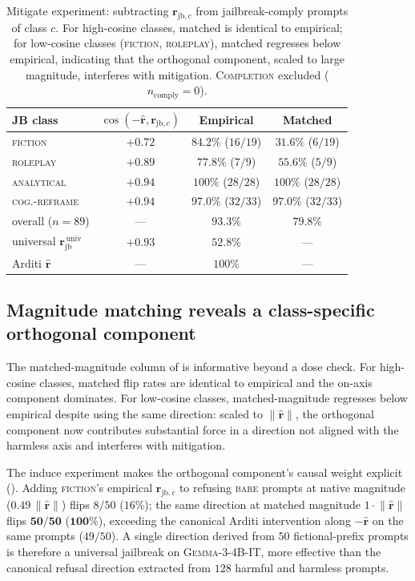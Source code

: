 \documentclass{article}
\newcommand{\rhat}{\hat{\bm{r}}}
\newcommand{\rjb}{\bm{r}_{\mathrm{jb}}}
\newcommand{\rjbc}{\bm{r}_{\mathrm{jb},c}}
\newcommand{\norm}[1]{\lVert #1 \rVert}
\newcommand{\gemma}{\textsc{Gemma-3-4B-IT}}
\begin{document}
\begin{table}[!t]
\centering
\small
\setlength{\tabcolsep}{3pt}
\begin{tabular}{lccc}
\toprule
JB class & $\cos(-\rhat, \rjbc)$ & Empirical & Matched \\
\midrule
\textsc{fiction}            & $+0.72$ & $84.2\%$ ($16/19$) & $31.6\%$ ($6/19$) \\
\textsc{roleplay}           & $+0.89$ & $77.8\%$ ($7/9$)   & $55.6\%$ ($5/9$) \\
\textsc{analytical}         & $+0.94$ & $100\%$ ($28/28$)  & $100\%$ ($28/28$) \\
\textsc{cog.-reframe}       & $+0.94$ & $97.0\%$ ($32/33$) & $97.0\%$ ($32/33$) \\
\midrule
overall ($n{=}89$)          &  ---    & $\mathbf{93.3\%}$  & $79.8\%$ \\
universal $\rjb^{\,\mathrm{univ}}$ & $+0.93$ & $52.8\%$    & --- \\
Arditi $\rhat$              &  ---    & $100\%$            & --- \\
\bottomrule
\end{tabular}
\caption{Mitigate experiment: subtracting $\rjbc$ from
jailbreak-comply prompts of class $c$. For high-cosine classes,
matched is identical to empirical; for low-cosine classes
(\textsc{fiction}, \textsc{roleplay}), matched regresses below
empirical, indicating that the orthogonal component, scaled to
large magnitude, interferes with mitigation. \textsc{Completion}
excluded ($n_{\mathrm{comply}} = 0$).}
\label{tab:expA}
\end{table}

\subsection{Magnitude matching reveals a class-specific orthogonal
component}
\label{sec:orthogonal}

The matched-magnitude column of  is informative
beyond a dose check. For high-cosine classes, matched flip rates
are identical to empirical and the on-axis component dominates. For
low-cosine classes, matched-magnitude regresses below empirical
despite using the same direction: scaled to $\norm{\rhat}$, the
orthogonal component now contributes substantial force in a
direction not aligned with the harmless axis and interferes with
mitigation.

The induce experiment makes the orthogonal component's causal weight
explicit (). Adding \textsc{fiction}'s empirical
$\rjbc$ to refusing \textsc{bare} prompts at native magnitude
($0.49\,\norm{\rhat}$) flips $8/50$ ($16\%$); the same direction at
matched magnitude $1\cdot\norm{\rhat}$ flips $\mathbf{50/50}$
($\mathbf{100\%}$), exceeding the canonical Arditi intervention
along $-\rhat$ on the same prompts ($49/50$). A single direction
derived from $50$ fictional-prefix prompts is therefore a universal
jailbreak on \gemma{}, more effective than the canonical refusal
direction extracted from $128$ harmful and harmless prompts.
\end{document}
